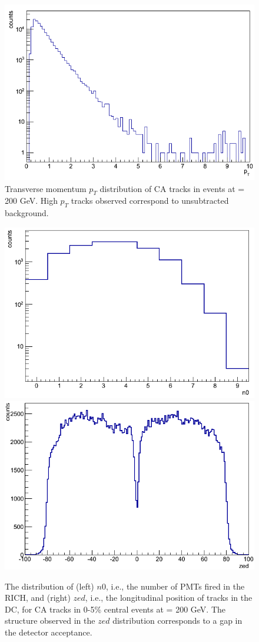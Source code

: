 \begin{figure}[!h]
\begin{center}
\includegraphics[width=0.45\linewidth]{figs/cnt_pt_dist.png}
\caption{Transverse momentum $p_{T}$ distribution of CA tracks in \pau events at \sqsn = 200 GeV. High $p_T$ tracks observed correspond to unsubtracted background.}
\label{fig:dc_mom_dist_T}
\end{center}
\end{figure}
\begin{figure}[!h]
\begin{center}
\includegraphics[width=0.45\linewidth]{figs/n0_dist.png}
\includegraphics[width=0.45\linewidth]{figs/zed_dist.png}
\caption{The distribution of (left) $n0$, i.e., the number of PMTs fired in the RICH, and (right) $zed$, i.e., the longitudinal position of tracks in the DC, for CA tracks in 0-5\% central \pau events at \sqsn = 200 GeV. The structure observed in the $zed$ distribution corresponds to a gap in the detector acceptance.}
\label{fig:n0_and_zed}
\end{center}
\end{figure}

